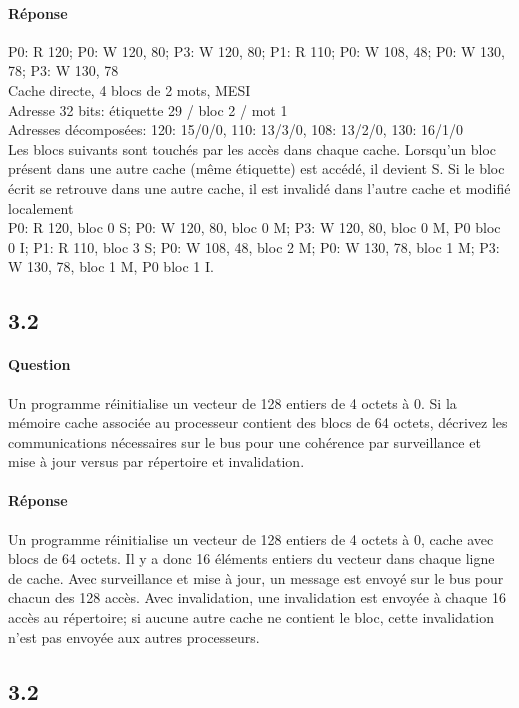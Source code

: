 \documentclass[oneside]{book}
\begin{document}
\paragraph{Réponse}
P0: R 120; P0: W 120, 80; P3: W 120, 80; P1: R 110; P0: W 108, 48; P0: W 130,
78; P3: W 130, 78\\

Cache directe, 4 blocs de 2 mots, MESI\\
Adresse 32 bits: étiquette 29 / bloc 2 / mot 1\\
Adresses décomposées: 120: 15/0/0, 110: 13/3/0, 108: 13/2/0, 130: 16/1/0\\

Les blocs suivants sont touchés par les accès dans chaque cache. Lorsqu'un
bloc présent dans une autre cache (même étiquette) est accédé, il devient S. Si
le bloc écrit se retrouve dans une autre cache, il est invalidé dans l'autre cache et
modifié localement\\

P0: R 120, bloc 0 S; P0: W 120, 80, bloc 0 M; P3: W 120, 80, bloc 0 M, P0 bloc 0
I; P1: R 110, bloc 3 S; P0: W 108, 48, bloc 2 M; P0: W 130, 78, bloc 1 M; P3: W
130, 78, bloc 1 M, P0 bloc 1 I.
\subsection{3.2}
\paragraph{Question}
Un programme réinitialise un vecteur de 128 entiers de 4 octets à 0. Si la mémoire
cache associée au processeur contient des blocs de 64 octets, décrivez les
communications nécessaires sur le bus pour une cohérence par surveillance et
mise à jour versus par répertoire et invalidation.
\paragraph{Réponse}
Un programme réinitialise un vecteur de 128 entiers de 4 octets à 0, cache avec
blocs de 64 octets. Il y a donc 16 éléments entiers du vecteur dans chaque ligne
de cache. Avec surveillance et mise à jour, un message est envoyé sur le bus
pour chacun des 128 accès. Avec invalidation, une invalidation est envoyée à
chaque 16 accès au répertoire; si aucune autre cache ne contient le bloc, cette
invalidation n'est pas envoyée aux autres processeurs.
\subsection{3.2}
\end{document}
